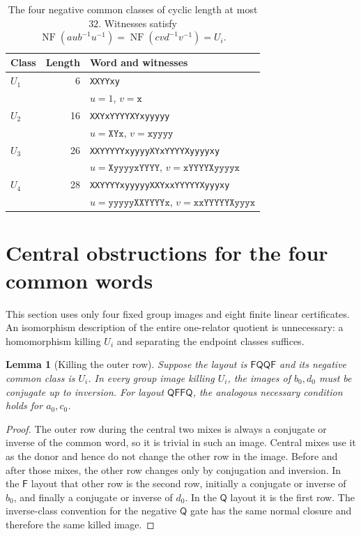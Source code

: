\documentclass[11pt,a4paper]{article}
\newtheorem{lemma}[theorem]{Lemma}
\theoremstyle{definition}\newtheorem{definition}[theorem]{Definition}
\theoremstyle{remark}\newtheorem{remark}[theorem]{Remark}
\newcommand{\NF}{\operatorname{NF}}
\newcommand{\F}{\mathsf F}
\newcommand{\Q}{\mathsf Q}
\newcommand{\word}[1]{\texttt{#1}}
\begin{document}
\begin{table}[H]\centering\small
\caption{The four negative common classes of cyclic length at most $32$. Witnesses satisfy $\NF(aub^{-1}u^{-1})=\NF(cvd^{-1}v^{-1})=U_i$.}\label{tab:classes}
\begin{tabular}{lrl}\toprule
Class & Length & Word and witnesses\\\midrule
$U_1$ &6&\word{XXYYxy}\\
&&$u=1$, $v=\word{x}$\\[5pt]
$U_2$ &16&\word{XXYxYYYYXYxyyyyy}\\
&&$u=\word{XYx}$, $v=\word{xyyyy}$\\[5pt]
$U_3$ &26&\word{XXYYYYYxyyyyXYxYYYYXyyyyxy}\\
&&$u=\word{XyyyyxYYYY}$, $v=\word{xYYYYXyyyyx}$\\[5pt]
$U_4$ &28&\word{XXYYYYxyyyyyXXYxxYYYYYXyyyxy}\\
&&$u=\word{yyyyyXXYYYYx}$, $v=\word{xxYYYYYXyyyx}$\\\bottomrule
\end{tabular}
\end{table}

\section{Central obstructions for the four common words}\label{sec:central}
This section uses only four fixed group images and eight finite linear certificates. An isomorphism description of the entire one-relator quotient is unnecessary: a homomorphism killing $U_i$ and separating the endpoint classes suffices.

\begin{lemma}[Killing the outer row]\label{lem:killouter}
Suppose the layout is $\F\Q\Q\F$ and its negative common class is $U_i$. In every group image killing $U_i$, the images of $b_0,d_0$ must be conjugate up to inversion. For layout $\Q\F\F\Q$, the analogous necessary condition holds for $a_0,c_0$.
\end{lemma}
\begin{proof}
The outer row during the central two mixes is always a conjugate or inverse of the common word, so it is trivial in such an image. Central mixes use it as the donor and hence do not change the other row in the image. Before and after those mixes, the other row changes only by conjugation and inversion. In the $\F$ layout that other row is the second row, initially a conjugate or inverse of $b_0$, and finally a conjugate or inverse of $d_0$. In the $\Q$ layout it is the first row. The inverse-class convention for the negative $\Q$ gate has the same normal closure and therefore the same killed image.
\end{proof}
\end{document}
